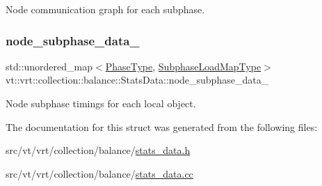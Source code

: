 Node communication graph for each subphase. 

\mbox{\label{structvt_1_1vrt_1_1collection_1_1balance_1_1_stats_data_ab4c0793fa752d0404dc52ccb95be0285}} 
\subsubsection{\texorpdfstring{node\+\_\+subphase\+\_\+data\+\_\+}{node\_subphase\_data\_}}
{\footnotesize\ttfamily std\+::unordered\+\_\+map$<$\hyperlink{namespacevt_a46ce6733d5cdbd735d561b7b4029f6d7}{Phase\+Type}, \hyperlink{namespacevt_1_1vrt_1_1collection_1_1balance_a8bdadb2583f128dd256e7d5a10826542}{Subphase\+Load\+Map\+Type}$>$ vt\+::vrt\+::collection\+::balance\+::\+Stats\+Data\+::node\+\_\+subphase\+\_\+data\+\_\+}



Node subphase timings for each local object. 



The documentation for this struct was generated from the following files\+:\begin{DoxyCompactItemize}
\item 
src/vt/vrt/collection/balance/\hyperlink{stats__data_8h}{stats\+\_\+data.\+h}\item 
src/vt/vrt/collection/balance/\hyperlink{stats__data_8cc}{stats\+\_\+data.\+cc}\end{DoxyCompactItemize}
